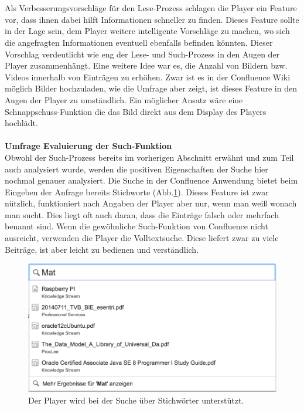 \documentclass[a4paper,12pt,twoside]{scrartcl}
\begin{document}
\\\\
Als Verbesserungsvorschläge für den Lese-Prozess schlagen die Player ein Feature vor, dass ihnen dabei hilft Informationen schneller zu finden. Dieses Feature sollte in der Lage sein, dem Player weitere intelligente Vorschläge zu machen, wo sich die angefragten Informationen eventuell ebenfalls befinden könnten. Dieser Vorschlag verdeutlicht wie eng der Lese- und Such-Prozess in den Augen der Player zusammenhängt. Eine weitere Idee war es, die Anzahl von Bildern bzw. Videos innerhalb von Einträgen zu erhöhen. Zwar ist es in der Confluence Wiki möglich Bilder hochzuladen, wie die Umfrage aber zeigt, ist dieses Feature in den Augen der Player zu umständlich. Ein möglicher Ansatz wäre eine Schnappschuss-Funktion die das Bild direkt aus dem Display des Players hochlädt.
\\\\
\textbf{Umfrage Evaluierung der Such-Funktion}\\
Obwohl der Such-Prozess bereits im vorherigen Abschnitt erwähnt und zum Teil auch analysiert wurde, werden die positiven Eigenschaften der Suche hier nochmal genauer analysiert. Die Suche in der Confluence Anwendung bietet beim Eingeben der Anfrage bereits Stichworte (Abb.\ref{Sucheingabe}). Dieses Feature ist zwar nützlich, funktioniert nach Angaben der Player aber nur, wenn man weiß wonach man sucht. Dies liegt oft auch daran, dass die Einträge falsch oder mehrfach benannt sind. Wenn die gewöhnliche Such-Funktion von Confluence nicht ausreicht, verwenden die Player die Volltextsuche. Diese liefert zwar zu viele Beiträge, ist aber leicht zu bedienen und verständlich.
\\
\begin{figure}[h!]
\begin{center}
\includegraphics[scale = 0.4]{Bilder/Sucheingabe.eps}
\caption{Der Player wird bei der Suche über Stichwörter unterstützt.}
\label{Sucheingabe}
\end{center}
\end{figure}
\end{document}
